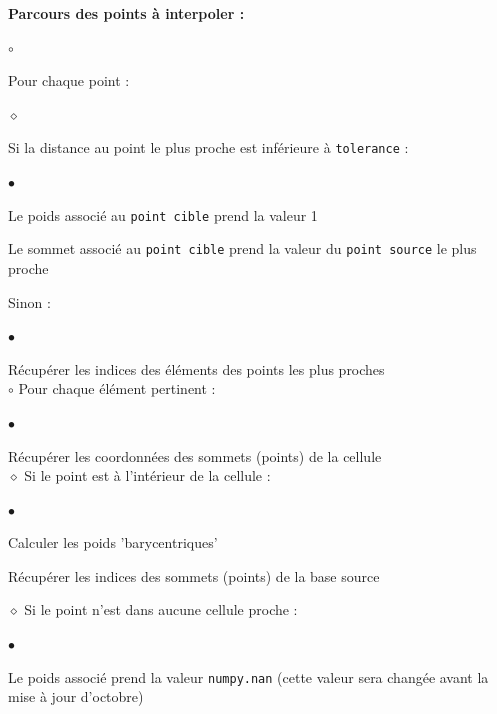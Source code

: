 \textbf{Parcours des points à interpoler :}
\begin{list}{$\circ$}{\leftmargin=0.5cm  \itemsep=0cm}
    \item Pour chaque point :
    \begin{list}{$\diamond$}{\leftmargin=0.5cm  \itemsep=0cm}
        \item Si la distance au point le plus proche est inférieure à \texttt{tolerance} :
        \begin{list}{$\bullet$}{\leftmargin=0.5cm \itemsep=0cm}
            \item Le poids associé au \texttt{point cible} prend la valeur 1
            \item Le sommet associé au \texttt{point cible} prend la valeur du \texttt{point source} le plus proche
        \end{list}
        \item Sinon :
        \begin{list}{$\bullet$}{\leftmargin=0.5cm  \itemsep=0cm}
            \item Récupérer les indices des éléments des points les plus proches\\
            $\circ$ Pour chaque élément pertinent :
            \begin{list}{$\bullet$}{\leftmargin=0.5cm \itemsep=0cm}
                \item Récupérer les coordonnées des sommets (points) de la cellule\\
                $\diamond$ Si le point est à l'intérieur de la cellule :
                \begin{list}{$\bullet$}{\leftmargin=0.5cm  \itemsep=0cm}
                    \item Calculer les poids 'barycentriques'
                    \item Récupérer les indices des sommets (points) de la base source
                \end{list}
            \end{list}
        \end{list}
    \end{list}
    $\diamond$ Si le point n'est dans aucune cellule proche :
    \begin{list}{$\bullet$}{\leftmargin=0.5cm  \itemsep=0cm}
        \item Le poids associé prend la valeur \texttt{numpy.nan} (cette valeur sera changée avant la mise à jour d'octobre)
    \end{list}
\end{list}

